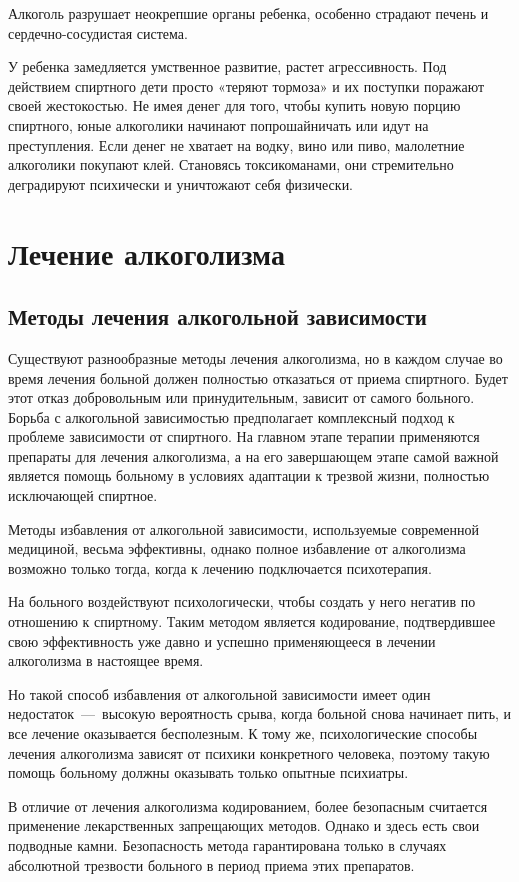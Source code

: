 \documentclass[14pt]{extarticle}
\begin{document}
Алкоголь разрушает неокрепшие органы ребенка, особенно страдают печень и сердечно-сосудистая система.

У ребенка замедляется умственное развитие, растет агрессивность. Под действием спиртного дети просто «теряют тормоза» и их поступки поражают своей жестокостью. Не имея денег для того, чтобы купить новую порцию спиртного, юные алкоголики начинают попрошайничать или идут на преступления. Если денег не хватает на водку, вино или пиво, малолетние алкоголики покупают клей. Становясь токсикоманами, они стремительно деградируют психически и уничтожают себя физически.
\section{Лечение алкоголизма}

\subsection{Методы лечения алкогольной зависимости}

Существуют разнообразные методы лечения алкоголизма, но в каждом случае во время лечения больной должен полностью отказаться от приема спиртного. Будет этот отказ добровольным или принудительным, зависит от самого больного. Борьба с алкогольной зависимостью предполагает комплексный подход к проблеме зависимости от спиртного. На главном этапе терапии применяются препараты для лечения алкоголизма, а на его завершающем этапе самой важной является помощь больному в условиях адаптации к трезвой жизни, полностью исключающей спиртное.

Методы избавления от алкогольной зависимости, используемые современной медициной, весьма эффективны, однако полное избавление от алкоголизма возможно только тогда, когда к лечению подключается психотерапия.

На больного воздействуют психологически, чтобы создать у него негатив по отношению к спиртному. Таким методом является кодирование, подтвердившее свою эффективность уже давно и успешно применяющееся в лечении алкоголизма в настоящее время.

Но такой способ избавления от алкогольной зависимости имеет один недостаток~---~высокую вероятность срыва, когда больной снова начинает пить, и все лечение оказывается бесполезным. К тому же, психологические способы лечения алкоголизма зависят от психики конкретного человека, поэтому такую помощь больному должны оказывать только опытные психиатры.

В отличие от лечения алкоголизма кодированием, более безопасным считается применение лекарственных запрещающих методов. Однако и здесь есть свои подводные камни. Безопасность метода гарантирована только в случаях абсолютной трезвости больного в период приема этих препаратов.
\end{document}
